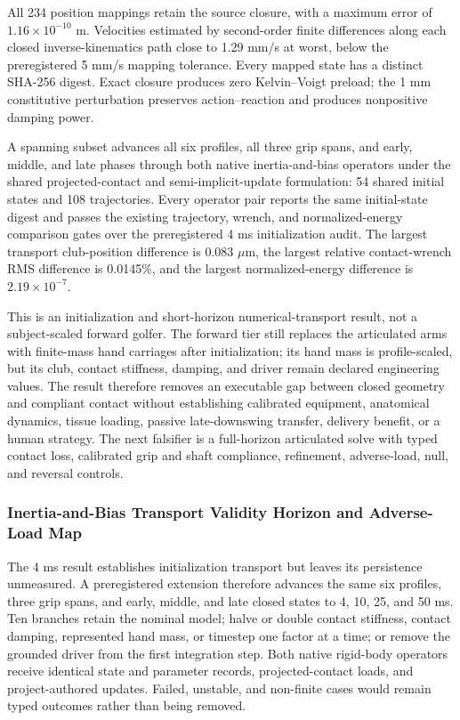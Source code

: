 \documentclass[
  letterpaper,
]{report}
\begin{document}
All 234 position mappings retain the source closure, with a maximum
error of \(1.16\times10^{-10}\) m. Velocities estimated by second-order
finite differences along each closed inverse-kinematics path close to
1.29 mm/s at worst, below the preregistered 5 mm/s mapping tolerance.
Every mapped state has a distinct SHA-256 digest. Exact closure produces
zero Kelvin--Voigt preload; the 1 mm constitutive perturbation preserves
action--reaction and produces nonpositive damping power.

A spanning subset advances all six profiles, all three grip spans, and
early, middle, and late phases through both native inertia-and-bias
operators under the shared projected-contact and semi-implicit-update
formulation: 54 shared initial states and 108 trajectories. Every
operator pair reports the same initial-state digest and passes the
existing trajectory, wrench, and normalized-energy comparison gates over
the preregistered 4 ms initialization audit. The largest transport
club-position difference is 0.083 \(\mu\)m, the largest relative
contact-wrench RMS difference is 0.0145\%, and the largest
normalized-energy difference is \(2.19\times10^{-7}\).

This is an initialization and short-horizon numerical-transport result,
not a subject-scaled forward golfer. The forward tier still replaces the
articulated arms with finite-mass hand carriages after initialization;
its hand mass is profile-scaled, but its club, contact stiffness,
damping, and driver remain declared engineering values. The result
therefore removes an executable gap between closed geometry and
compliant contact without establishing calibrated equipment, anatomical
dynamics, tissue loading, passive late-downswing transfer, delivery
benefit, or a human strategy. The next falsifier is a full-horizon
articulated solve with typed contact loss, calibrated grip and shaft
compliance, refinement, adverse-load, null, and reversal controls.

\subsubsection{Inertia-and-Bias Transport Validity Horizon and
Adverse-Load
Map}\label{inertia-and-bias-transport-validity-horizon-and-adverse-load-map}

The 4 ms result establishes initialization transport but leaves its
persistence unmeasured. A preregistered extension therefore advances the
same six profiles, three grip spans, and early, middle, and late closed
states to 4, 10, 25, and 50 ms. Ten branches retain the nominal model;
halve or double contact stiffness, contact damping, represented hand
mass, or timestep one factor at a time; or remove the grounded driver
from the first integration step. Both native rigid-body operators
receive identical state and parameter records, projected-contact loads,
and project-authored updates. Failed, unstable, and non-finite cases
would remain typed outcomes rather than being removed.
\end{document}

